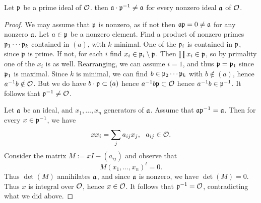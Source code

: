\begin{lemma}
  Let $\mathfrak{p}$ be a prime ideal of $\mathcal{O}$.
  then $\mathfrak{a} \cdot \mathfrak{p}^{-1} \neq \mathfrak{a}$ for every nonzero ideal $\mathfrak{a}$ of $\mathcal{O}$.
\end{lemma}
\begin{proof}
  We may assume that $\mathfrak{p}$ is nonzero, as if not then $\mathfrak{a} \mathfrak{p} =0 \neq \mathfrak{a}$ for any nonzero $\mathfrak{a}$.
  Let $a \in \mathfrak{p}$ be a nonzero element.
  Find a product of nonzero primes $\mathfrak{p}_{1} \cdots \mathfrak{p}_{k}$ contained in $(a)$, with $k$ minimal.
  One of the $\mathfrak{p}_{i}$ is contained in $\mathfrak{p}$, since $\mathfrak{p}$ is prime.
  If not, for each $i$ find $x_i \in \mathfrak{p}_{i}\setminus \mathfrak{p}$.
  Then $\prod x_i \in \mathfrak{p}$, so by primality one of the $x_i$ is as well.
  Rearranging, we can assume $i = 1$, and thus $\mathfrak{p} = \mathfrak{p}_{1}$ since $\mathfrak{p}_{1}$ is maximal.
  Since $k$ is minimal, we can find $b \in \mathfrak{p}_{2} \cdots \mathfrak{p}_{k}$ with $b \notin (a)$, hence $a^{-1}b \notin \mathcal{O}$.
  But we do have $b \cdot \mathfrak{p} \subset (a)$ hence $a^{-1} b \mathfrak{p} \subset \mathcal{O}$ hence $a^{-1}b \in \mathfrak{p}^{-1}$.
  It follows that $\mathfrak{p}^{-1} \neq \mathcal{O}$.

  Let $\mathfrak{a}$ be an ideal, and $x_{1},\ldots,x_{n}$ generators of $\mathfrak{a}$.
  Assume that $\mathfrak{a} \mathfrak{p}^{-1} = \mathfrak{a}$.
  Then for every $x \in \mathfrak{p}^{-1}$, we have
  \[ x x_{i} = \sum_{j} a_{ij} x_{j}, \ \ a_{ij} \in \mathcal{O}. \]
  Consider the matrix $M := xI - (a_{ij})$ and observe that
  \[ M (x_{1},\ldots,x_{n})^{t} = 0.  \]
  Thus $\det(M)$ annihilates $\mathfrak{a}$, and since $\mathfrak{a}$ is nonzero, we have $\det(M) = 0$.
  Thus $x$ is integral over $\mathcal{O}$, hence $x \in \mathcal{O}$.
  It follows that $\mathfrak{p}^{-1} = \mathcal{O}$, contradicting what we did above.
\end{proof}

